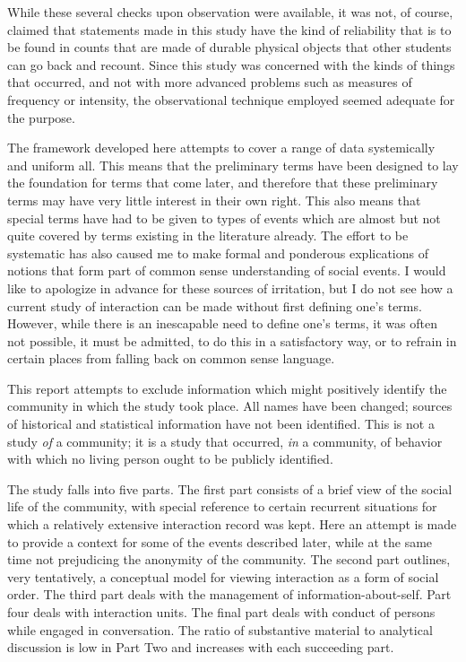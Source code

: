 \documentclass[twoside,symmetric,nobib,justified]{tufte-book}
\begin{document}
While these several checks upon observation were available, it was not,
of course, claimed that statements made in this study have the kind of
reliability that is to be found in counts that are made of durable
physical objects that other students can go back and recount. Since this
study was concerned with the kinds of things that occurred, and not with
more advanced problems such as measures of frequency or intensity, the
observational technique employed seemed adequate for the purpose.

The framework developed here attempts to cover a range of data
systemically and uniform all. This means that the preliminary terms have
been designed to lay the foundation for terms that come later, and
therefore that these preliminary terms may have very little interest in
their own right. This also means that special terms have had to be given
to types of events which are almost but not quite covered by terms
existing in the literature already. The effort to be systematic has also
caused me to make formal and ponderous explications of notions that form
part of common sense understanding of social events. I would like to
apologize in advance for these sources of irritation, but I do not see
how a current study of interaction can be made without first defining
one's terms. However, while there is an inescapable need to define one's
terms, it was often not possible, it must be admitted, to do this in a
satisfactory way, or to refrain in certain places from falling back on
common sense language.

This report attempts to exclude information which might positively
identify the community in which the study took place. All names have
been changed; sources of historical and statistical information have not
been identified. This is not a study \emph{of} a community; it is a
study that occurred, \emph{in} a community, of behavior with which no
living person ought to be publicly identified.

The study falls into five parts. The first part consists of a brief view
of the social life of the community, with special reference to certain
recurrent situations for which a relatively extensive interaction record
was kept. Here an attempt is made to provide a context for some of the
events described later, while at the same time not prejudicing the
anonymity of the community. The second part outlines, very tentatively,
a conceptual model for viewing interaction as a form of social order.
The third part deals with the management of information-about-self. Part
four deals with interaction units. The final part deals with conduct of
persons while engaged in conversation. The ratio of substantive material
to analytical discussion is low in Part Two and increases with each
succeeding part.
\end{document}
